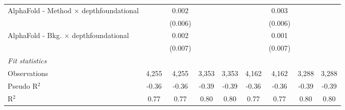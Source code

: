 \begin{tabular}{lcccccccc}
   AlphaFold - Method $\times$ depthfoundational  &              & 0.002          &       &       &              & 0.003          &       &   \\   
                                                  &              & (0.006)        &       &       &              & (0.006)        &       &   \\   
   AlphaFold - Bkg. $\times$ depthfoundational    &              & 0.002          &       &       &              & 0.001          &       &   \\   
                                                  &              & (0.007)        &       &       &              & (0.007)        &       &   \\   
   \midrule
   \emph{Fit statistics}\\
   Observations                                   & 4,255        & 4,255          & 3,353 & 3,353 & 4,162        & 4,162          & 3,288 & 3,288\\  
   Pseudo R$^2$                                   & -0.36        & -0.36          & -0.39 & -0.39 & -0.36        & -0.36          & -0.39 & -0.39\\  
   R$^2$                                          & 0.77         & 0.77           & 0.80  & 0.80  & 0.77         & 0.77           & 0.80  & 0.80\\  
   

\end{tabular}

